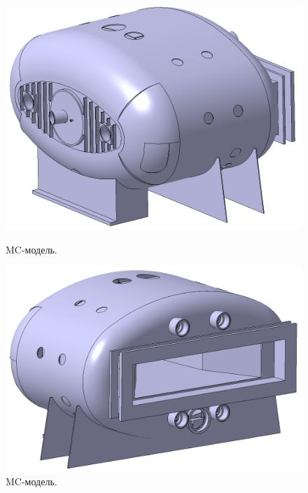 \begin{figure}[H]
\begin{minipage}[b]{0.49\textwidth}
\includegraphics[width=1.0\textwidth]{pictures/GLAD1.png}
\caption{MC-модель.}
\label{fig:GLAD1}
\end{minipage}
\hspace{0.01\textwidth}
\begin{minipage}[b]{0.49\textwidth}
\includegraphics[width=1.0\textwidth]{pictures/GLAD2.png}
\caption{MC-модель.}
\label{fig:GLAD2}
\end{minipage}


\end{figure}
